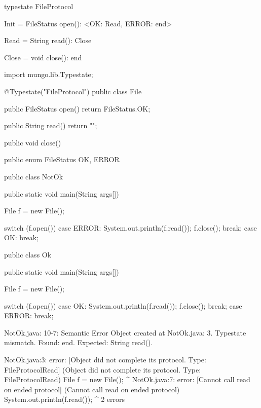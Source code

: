 \begin{code}
typestate FileProtocol {

  Init = {
    FileStatus open(): <OK: Read, ERROR: end>
  }

  Read = {
    String read(): Close
  }

  Close = {
    void close(): end
  }

}\end{code}

\begin{code}
import mungo.lib.Typestate;

@Typestate("FileProtocol")
public class File {

  public FileStatus open() {
    return FileStatus.OK;
  }

  public String read() {
    return "";
  }

  public void close() {

  }

}\end{code}

\begin{code}
public enum FileStatus {
  OK, ERROR
}\end{code}

\begin{code}
public class NotOk {
  public static void main(String args[]) {
    File f = new File();

    switch (f.open()) {
      case ERROR:
        System.out.println(f.read());
        f.close();
        break;
      case OK:
        break;
    }
  }
}\end{code}

\begin{code}
public class Ok {
  public static void main(String args[]) {
    File f = new File();

    switch (f.open()) {
      case OK:
        System.out.println(f.read());
        f.close();
        break;
      case ERROR:
        break;
    }
  }
}\end{code}

\lstset{caption=Original Mungo output}
\begin{code}

NotOk.java: 10-7: Semantic Error
		Object created at NotOk.java: 3. Typestate mismatch. Found: end. Expected: String read().
\end{code}

\lstset{caption=New Mungo output}
\begin{code}
NotOk.java:3: error: [Object did not complete its protocol. Type: FileProtocol{Read}] (Object did not complete its protocol. Type: FileProtocol{Read})
    File f = new File();
         ^
NotOk.java:7: error: [Cannot call read on ended protocol] (Cannot call read on ended protocol)
        System.out.println(f.read());
                                 ^
2 errors
\end{code}

